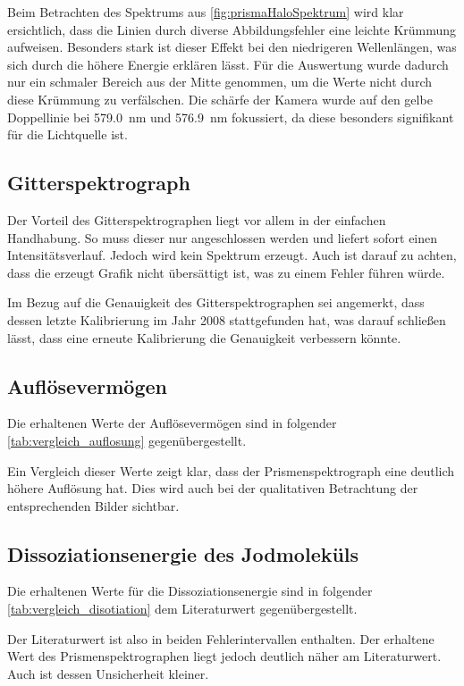\documentclass[12pt,english,ngerman]{scrartcl}
\begin{document}
Beim Betrachten des Spektrums aus \autoref{fig:prismaHaloSpektrum} wird klar
ersichtlich, dass die Linien durch diverse Abbildungsfehler eine leichte
Krümmung aufweisen. Besonders stark ist dieser Effekt bei den niedrigeren
Wellenlängen, was sich durch die höhere Energie erklären lässt. Für die
Auswertung wurde dadurch nur ein schmaler Bereich aus der Mitte genommen, um
die Werte nicht durch diese Krümmung zu verfälschen. Die schärfe der Kamera
wurde auf den gelbe Doppellinie bei \SI{579.0}{\nano\meter} und
\SI{576.9}{\nano\meter} fokussiert, da diese besonders signifikant für die
Lichtquelle ist.

\subsection{Gitterspektrograph}

Der Vorteil des Gitterspektrographen liegt vor allem in der einfachen
Handhabung. So muss dieser nur angeschlossen werden und liefert sofort einen
Intensitätsverlauf. Jedoch wird kein Spektrum erzeugt. Auch ist darauf zu
achten, dass die erzeugt Grafik nicht übersättigt ist, was zu einem Fehler
führen würde.

Im Bezug auf die Genauigkeit des Gitterspektrographen sei angemerkt, dass
dessen letzte Kalibrierung im Jahr 2008 stattgefunden hat, was darauf schließen
lässt, dass eine erneute Kalibrierung die Genauigkeit verbessern könnte.

\subsection{Auflösevermögen}
Die erhaltenen Werte der Auflösevermögen sind in folgender
\autoref{tab:vergleich_auflosung} gegenübergestellt.

Ein Vergleich dieser Werte zeigt klar, dass der Prismenspektrograph eine
deutlich höhere Auflösung hat. Dies wird auch bei der qualitativen Betrachtung
der entsprechenden Bilder sichtbar.

\subsection{Dissoziationsenergie des Jodmoleküls}

Die erhaltenen Werte für die Dissoziationsenergie sind in folgender
\autoref{tab:vergleich_disotiation} dem Literaturwert gegenübergestellt.

Der Literaturwert ist also in beiden Fehlerintervallen enthalten. Der erhaltene
Wert des Prismenspektrographen liegt jedoch deutlich näher am Literaturwert.
Auch ist dessen Unsicherheit kleiner.
\end{document}
